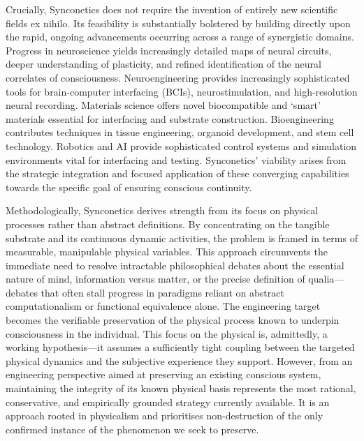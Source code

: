 \documentclass[10pt]{article}
\begin{document}
\begin{sloppypar}
  Crucially, Synconetics does not require the invention of entirely new scientific fields ex nihilo. Its feasibility is substantially bolstered by building directly upon the rapid, ongoing advancements occurring across a range of synergistic domains. Progress in neuroscience yields increasingly detailed maps of neural circuits, deeper understanding of plasticity, and refined identification of the neural correlates of consciousness. Neuroengineering provides increasingly sophisticated tools for brain-computer interfacing (BCIs), neurostimulation, and high-resolution neural recording. Materials science offers novel biocompatible and ‘smart’ materials essential for interfacing and substrate construction. Bioengineering contributes techniques in tissue engineering, organoid development, and stem cell technology. Robotics and AI provide sophisticated control systems and simulation environments vital for interfacing and testing. Synconetics’ viability arises from the strategic integration and focused application of these converging capabilities towards the specific goal of ensuring conscious continuity.

  Methodologically, Synconetics derives strength from its focus on physical processes rather than abstract definitions. By concentrating on the tangible substrate and its continuous dynamic activities, the problem is framed in terms of measurable, manipulable physical variables. This approach circumvents the immediate need to resolve intractable philosophical debates about the essential nature of mind, information versus matter, or the precise definition of qualia—debates that often stall progress in paradigms reliant on abstract computationalism or functional equivalence alone. The engineering target becomes the verifiable preservation of the physical process known to underpin consciousness in the individual. This focus on the physical is, admittedly, a working hypothesis—it assumes a sufficiently tight coupling between the targeted physical dynamics and the subjective experience they support. However, from an engineering perspective aimed at preserving an existing conscious system, maintaining the integrity of its known physical basis represents the most rational, conservative, and empirically grounded strategy currently available. It is an approach rooted in physicalism and prioritises non-destruction of the only confirmed instance of the phenomenon we seek to preserve.


\end{sloppypar}
\end{document}
